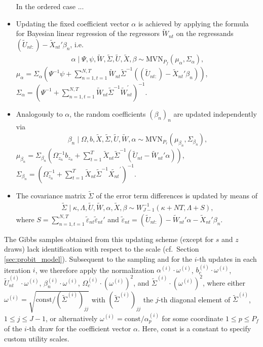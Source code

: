 \documentclass[article,shortnames]{jss}
\begin{document}
\begin{itemize}
  In the ordered case ...
  \item Updating the fixed coefficient vector $\alpha$ is achieved by applying the formula for Bayesian linear regression of the regressors $\tilde{W}_{nt}$ on the regressands $(\tilde{U}_{nt:})-\tilde{X}_{nt}'\beta_n$, i.e.\
  \begin{align*}
  \alpha \mid \Psi,\psi,\tilde{W},\tilde{\Sigma},\tilde{U},\tilde{X},\beta \sim \text{MVN}_{P_f}(\mu_\alpha,\Sigma_\alpha),
  \end{align*}
  $\mu_\alpha = \Sigma_\alpha (\Psi^{-1}\psi + \sum_{n=1,t=1}^{N,T} \tilde{W}_{nt} \tilde{\Sigma}^{-1} ((\tilde{U}_{nt:})-\tilde{X}_{nt}'\beta_n) )$, $\Sigma_\alpha = (\Psi^{-1} + \sum_{n=1,t=1}^{N,T} \tilde{W}_{nt}\tilde{\Sigma}^{-1} \tilde{W}_{nt}^{'} )^{-1}$.
  \item Analogously to $\alpha$, the random coefficients $(\beta_n)_n$ are updated independently via
  \begin{align*}
  \beta_n \mid \Omega,b,\tilde{X},\tilde{\Sigma},\tilde{U},\tilde{W},\alpha \sim \text{MVN}_{P_r}(\mu_{\beta_n},\Sigma_{\beta_n}),
  \end{align*}
  $\mu_{\beta_n} = \Sigma_{\beta_n} (\Omega_{z_n}^{-1}b_{z_n} + \sum_{t=1}^{T} \tilde{X}_{nt} \tilde{\Sigma}^{-1} (\tilde{U}_{nt}-\tilde{W}_{nt}'\alpha) )$, $\Sigma_{\beta_n} = (\Omega_{z_n}^{-1} + \sum_{t=1}^{T} \tilde{X}_{nt}\tilde{\Sigma}^{-1} \tilde{X_{nt}}^{'} )^{-1}$.
    \item The covariance matrix $\tilde{\Sigma}$ of the error term differences is updated by means of
  \begin{align*}
  \tilde{\Sigma} \mid \kappa,\Lambda,\tilde{U},\tilde{W},\alpha,\tilde{X},\beta \sim W^{-1}_{J-1}(\kappa+NT,\Lambda+S),
  \end{align*}
  where $S = \sum_{n=1,t=1}^{N,T} \tilde{\varepsilon}_{nt} \tilde{\varepsilon}_{nt}'$ and $\tilde{\varepsilon}_{nt} = (\tilde{U}_{nt:}) - \tilde{W}_{nt}'\alpha - \tilde{X}_{nt}'\beta_n$.
\end{itemize}

The Gibbs samples obtained from this updating scheme (except for $s$ and $z$ draws) lack identification with respect to the scale (cf.\ Section \ref{sec:probit_model}). Subsequent to the sampling and for the $i$-th updates in each iteration $i$, we therefore apply the normalization $\alpha^{(i)} \cdot \omega^{(i)}$, $b_c^{(i)} \cdot \omega^{(i)}$, $\tilde{U}_{nt}^{(i)} \cdot \omega^{(i)}$, $\beta_n^{(i)} \cdot \omega^{(i)}$, $\Omega_c^{(i)} \cdot (\omega^{(i)})^2$, and $\tilde{\Sigma}^{(i)} \cdot (\omega^{(i)})^2$, where either $\omega^{(i)} = \sqrt{\text{const} / (\tilde{\Sigma}^{(i)})_{jj}}$ with $(\tilde{\Sigma}^{(i)})_{jj}$ the $j$-th diagonal element of $\tilde{\Sigma}^{(i)}$, $1\leq j \leq J-1$, or alternatively $\omega^{(i)} = \text{const} / \alpha^{(i)}_p$ for some coordinate $1\leq p \leq P_f$ of the $i$-th draw for the coefficient vector $\alpha$. Here, $\text{const}$ is a constant to specify custom utility scales.
\end{document}
